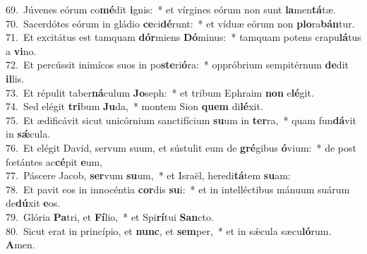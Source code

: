 {69.~}Júvenes eórum co\textbf{mé}dit \textbf{i}gnis:~* et vírgines eórum non sunt \textbf{la}men\textbf{tá}tæ.\\
{70.~}Sacerdótes eórum in gládio \textbf{ce}ci\textbf{dé}runt:~* et víduæ eórum non \textbf{plo}ra\textbf{bán}tur.\\
{71.~}Et excitátus est tamquam \textbf{dór}miens \textbf{Dó}minus:~* tamquam potens crapu\textbf{lá}tus a \textbf{vi}no.\\
{72.~}Et percússit inimícos suos in po\textbf{ste}ri\textbf{ó}ra:~* oppróbrium sempitérnum \textbf{de}dit \textbf{il}lis.\\
{73.~}Et répulit taber\textbf{ná}culum \textbf{Jo}seph:~* et tribum Ephraim \textbf{non} e\textbf{lé}git.\\
{74.~}Sed elégit \textbf{tri}bum \textbf{Ju}da,~* montem Sion \textbf{quem} di\textbf{lé}xit.\\
{75.~}Et ædificávit sicut unicórnium sanctifícium \textbf{su}um in \textbf{ter}ra,~* quam fun\textbf{dá}vit in \textbf{sǽ}cula.\\
{76.~}Et elégit David, servum suum, et sústulit eum de \textbf{gré}gibus \textbf{ó}vium:~* de post fœtántes ac\textbf{cé}pit \textbf{e}um,\\
{77.~}Páscere Jacob, \textbf{ser}vum \textbf{su}um,~* et Israël, heredi\textbf{tá}tem \textbf{su}am:\\
{78.~}Et pavit eos in innocéntia \textbf{cor}dis \textbf{su}i:~* et in intelléctibus mánuum suárum de\textbf{dú}xit \textbf{e}os.\\
{79.~}Glória \textbf{Pa}tri, et \textbf{Fí}lio,~* et Spi\textbf{rí}tui \textbf{San}cto.\\
{80.~}Sicut erat in princípio, et \textbf{nunc}, et \textbf{sem}per,~* et in sǽcula sæcu\textbf{ló}rum. \textbf{A}men.\\
